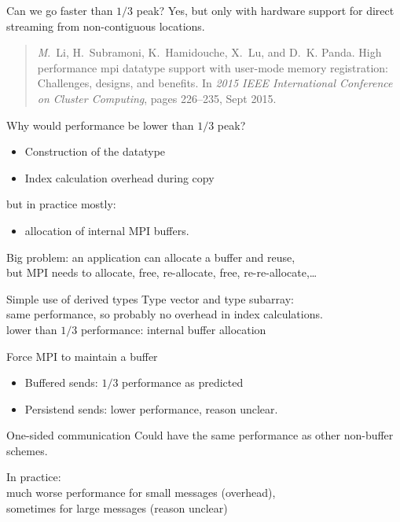 \documentclass[11pt,headernav]{beamer}
\begin{document}
\begin{frame}[containsverbatim]{Can we go faster than $1/3$ peak?}
  Yes, but only with hardware support for direct streaming from
  non-contiguous locations.

  \begin{quotation}
    \textsl M.~Li, H.~Subramoni, K.~Hamidouche, X.~Lu, and
    D.~K. Panda.  High performance mpi datatype support with user-mode
    memory registration: Challenges, designs, and benefits.  In {\em
      2015 IEEE International Conference on Cluster Computing}, pages
    226--235, Sept 2015.
  \end{quotation}
\end{frame}

\begin{frame}[containsverbatim]{Why would performance be lower than $1/3$ peak?}
  \begin{itemize}
  \item Construction of the datatype
  \item Index calculation overhead during copy
  \end{itemize}
but in practice mostly:
\begin{itemize}
\item allocation of internal MPI buffers.
\end{itemize}
Big problem: an application can allocate a buffer and reuse,\\
but MPI needs to allocate, free, re-allocate, free, re-re-allocate,\ldots
\end{frame}

\begin{frame}[containsverbatim]{Simple use of derived types}
  Type vector and type subarray:\\
  same performance, so probably no overhead in index calculations.\\
  lower than $1/3$ performance: internal buffer allocation
\end{frame}

\begin{frame}[containsverbatim]{Force MPI to maintain a buffer}
  \begin{itemize}
  \item Buffered sends: $1/3$ performance as predicted
  \item Persistend sends: lower performance, reason unclear.
  \end{itemize}
\end{frame}

\begin{frame}[containsverbatim]{One-sided communication}
  Could have the same performance as other non-buffer schemes.

  In practice:\\
  much worse performance for small messages (overhead),\\
  sometimes for large messages (reason unclear)
\end{frame}
\end{document}
